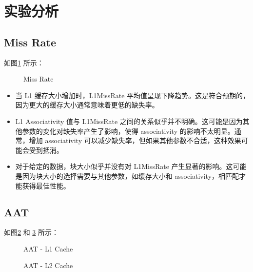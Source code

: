 
\section{实验分析}

\subsection{Miss Rate}

如图\ref{fig:mr} 所示：

\begin{figure}[!hbtp]
    \centering
    \caption{Miss Rate}\label{fig:mr}
\end{figure}

\begin{itemize}
    \item 当 L1 缓存大小增加时，L1MissRate 平均值呈现下降趋势。这是符合预期的，因为更大的缓存大小通常意味着更低的缺失率。
    \item L1 Associativity 值与 L1MissRate 之间的关系似乎并不明确。这可能是因为其他参数的变化对缺失率产生了影响，使得 associativity 的影响不太明显。通常，增加 associativity 可以减少缺失率，但如果其他参数不合适，这种效果可能会受到抵消。
    \item 对于给定的数据，块大小似乎并没有对 L1MissRate 产生显著的影响。这可能是因为块大小的选择需要与其他参数，如缓存大小和 associativity，相匹配才能获得最佳性能。
\end{itemize}


\subsection{AAT}

如图\ref{fig:aatL1} 和 \ref{fig:aatL2} 所示：

\begin{figure}[!hbtp]
    \centering

    \caption{AAT - L1 Cache}\label{fig:aatL1}

\end{figure}

\begin{figure}[!hbtp]
    \centering
    \caption{AAT - L2 Cache}\label{fig:aatL2}

\end{figure}

